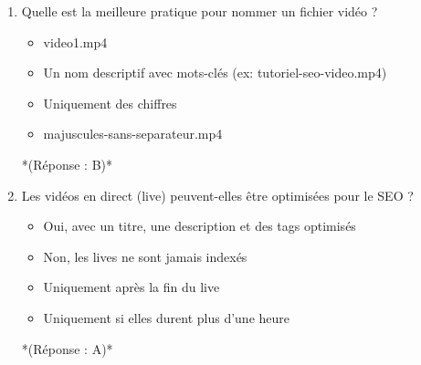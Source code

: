 \documentclass[12pt,a4paper,twoside]{report}
\begin{document}
\begin{enumerate}
    \item Quelle est la meilleure pratique pour nommer un fichier vidéo ?
    \begin{itemize}
        \item[A)] video1.mp4
        \item[B)] Un nom descriptif avec mots-clés (ex: tutoriel-seo-video.mp4)
        \item[C)] Uniquement des chiffres
        \item[D)] majuscules-sans-separateur.mp4
    \end{itemize}
    *(Réponse : B)*

    \item Les vidéos en direct (live) peuvent-elles être optimisées pour le SEO ?
    \begin{itemize}
        \item[A)] Oui, avec un titre, une description et des tags optimisés
        \item[B)] Non, les lives ne sont jamais indexés
        \item[C)] Uniquement après la fin du live
        \item[D)] Uniquement si elles durent plus d'une heure
    \end{itemize}
    *(Réponse : A)*
\end{enumerate}
\end{document}
